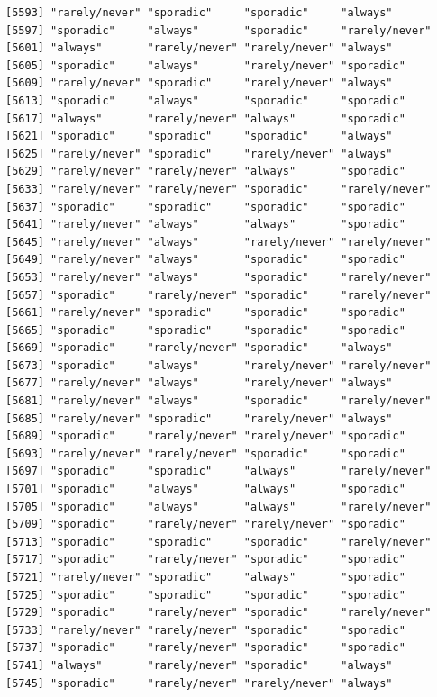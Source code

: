 \documentclass[
  letterpaper,
  DIV=11,
  numbers=noendperiod]{scrartcl}
\begin{document}
\begin{verbatim}
[5593] "rarely/never" "sporadic"     "sporadic"     "always"      
[5597] "sporadic"     "always"       "sporadic"     "rarely/never"
[5601] "always"       "rarely/never" "rarely/never" "always"      
[5605] "sporadic"     "always"       "rarely/never" "sporadic"    
[5609] "rarely/never" "sporadic"     "rarely/never" "always"      
[5613] "sporadic"     "always"       "sporadic"     "sporadic"    
[5617] "always"       "rarely/never" "always"       "sporadic"    
[5621] "sporadic"     "sporadic"     "sporadic"     "always"      
[5625] "rarely/never" "sporadic"     "rarely/never" "always"      
[5629] "rarely/never" "rarely/never" "always"       "sporadic"    
[5633] "rarely/never" "rarely/never" "sporadic"     "rarely/never"
[5637] "sporadic"     "sporadic"     "sporadic"     "sporadic"    
[5641] "rarely/never" "always"       "always"       "sporadic"    
[5645] "rarely/never" "always"       "rarely/never" "rarely/never"
[5649] "rarely/never" "always"       "sporadic"     "sporadic"    
[5653] "rarely/never" "always"       "sporadic"     "rarely/never"
[5657] "sporadic"     "rarely/never" "sporadic"     "rarely/never"
[5661] "rarely/never" "sporadic"     "sporadic"     "sporadic"    
[5665] "sporadic"     "sporadic"     "sporadic"     "sporadic"    
[5669] "sporadic"     "rarely/never" "sporadic"     "always"      
[5673] "sporadic"     "always"       "rarely/never" "rarely/never"
[5677] "rarely/never" "always"       "rarely/never" "always"      
[5681] "rarely/never" "always"       "sporadic"     "rarely/never"
[5685] "rarely/never" "sporadic"     "rarely/never" "always"      
[5689] "sporadic"     "rarely/never" "rarely/never" "sporadic"    
[5693] "rarely/never" "rarely/never" "sporadic"     "sporadic"    
[5697] "sporadic"     "sporadic"     "always"       "rarely/never"
[5701] "sporadic"     "always"       "always"       "sporadic"    
[5705] "sporadic"     "always"       "always"       "rarely/never"
[5709] "sporadic"     "rarely/never" "rarely/never" "sporadic"    
[5713] "sporadic"     "sporadic"     "sporadic"     "rarely/never"
[5717] "sporadic"     "rarely/never" "sporadic"     "sporadic"    
[5721] "rarely/never" "sporadic"     "always"       "sporadic"    
[5725] "sporadic"     "sporadic"     "sporadic"     "sporadic"    
[5729] "sporadic"     "rarely/never" "sporadic"     "rarely/never"
[5733] "rarely/never" "rarely/never" "sporadic"     "sporadic"    
[5737] "sporadic"     "rarely/never" "sporadic"     "sporadic"    
[5741] "always"       "rarely/never" "sporadic"     "always"      
[5745] "sporadic"     "rarely/never" "rarely/never" "always"      

\end{verbatim}
\end{document}
